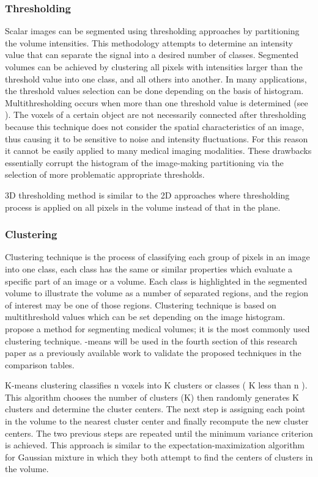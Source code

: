 \subsubsection{ Thresholding }
Scalar images can be segmented using thresholding approaches by partitioning the volume intensities. This methodology attempts to determine an intensity value that can separate the signal into a desired number of classes. Segmented volumes can be achieved by clustering all pixels with intensities larger than the threshold value into one class, and all others into another. In many applications, the threshold values selection can be done depending on the basis of histogram. Multithresholding occurs when more than one threshold value is determined (see \cite{Sahoo:1988:STT:46072.46079}).
The voxels of a certain object are not necessarily connected after thresholding because this technique does not consider the spatial characteristics of an image, thus causing it to be sensitive to noise and intensity fluctuations. For this reason it cannot be easily applied to many medical imaging modalities. These drawbacks essentially corrupt the histogram of the image-making partitioning via the selection of more problematic appropriate thresholds.

3D thresholding method is similar to the 2D approaches where thresholding process is applied on all pixels in the volume instead of that in the plane.


\subsubsection{ Clustering }
Clustering technique is the process of classifying each group of pixels in an image into one class, each class has the same or similar properties which evaluate a specific part of an image or a volume. Each class is highlighted in the segmented volume to illustrate the volume as a number of separated regions, and the region of interest may be one of those regions. Clustering technique is based on multithreshold values which can be set depending on the image histogram. \cite{AMIRA20081954} propose a method for segmenting medical volumes; it is the most commonly used clustering technique. -means will be used in the fourth section of this research paper as a previously available work to validate the proposed techniques in the comparison tables.

K-means clustering classifies n voxels into K clusters or classes ( K less than n ). This algorithm chooses the number of clusters (K) then randomly generates K clusters and determine the cluster centers. The next step is assigning each point in the volume to the nearest cluster center and finally recompute the new cluster centers. The two previous steps are repeated until the minimum variance criterion is achieved. This approach is similar to the expectation-maximization algorithm for Gaussian mixture in which they both attempt to find the centers of clusters in the volume.

